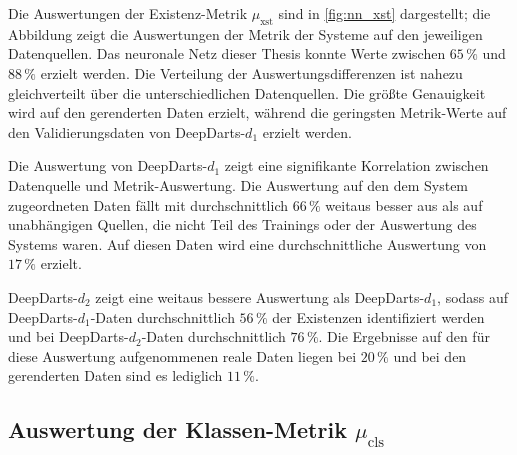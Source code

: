 Die Auswertungen der Existenz-Metrik $\mu_\text{xst}$ sind in \autoref{fig:nn_xst} dargestellt; die Abbildung zeigt die Auswertungen der Metrik der Systeme auf den jeweiligen Datenquellen. Das neuronale Netz dieser Thesis konnte Werte zwischen $65\,\%$ und $88\,\%$ erzielt werden. Die Verteilung der Auswertungsdifferenzen ist nahezu gleichverteilt über die unterschiedlichen Datenquellen. Die größte Genauigkeit wird auf den gerenderten Daten erzielt, während die geringsten Metrik-Werte auf den Validierungsdaten von DeepDarts-$d_1$ erzielt werden.

Die Auswertung von DeepDarts-$d_1$ zeigt eine signifikante Korrelation zwischen Datenquelle und Metrik-Auswertung. Die Auswertung auf den dem System zugeordneten Daten fällt mit durchschnittlich $66\,\%$ weitaus besser aus als auf unabhängigen Quellen, die nicht Teil des Trainings oder der Auswertung des Systems waren. Auf diesen Daten wird eine durchschnittliche Auswertung von $17\,\%$ erzielt.

DeepDarts-$d_2$ zeigt eine weitaus bessere Auswertung als DeepDarts-$d_1$, sodass auf DeepDarts-$d_1$-Daten durchschnittlich $56\,\%$ der Existenzen identifiziert werden und bei DeepDarts-$d_2$-Daten durchschnittlich $76\,\%$. Die Ergebnisse auf den für diese Auswertung aufgenommenen reale Daten liegen bei $20\,\%$ und bei den gerenderten Daten sind es lediglich $11\,\%$.


\subsection{Auswertung der Klassen-Metrik \texorpdfstring{$\mu_\text{cls}$}{µ\_cls}}
\label{sec:auswertung_cls}

\NNCls


